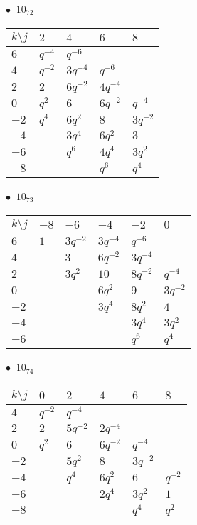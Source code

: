 %
\begin{minipage}{\linewidth}
$\bullet\ $ $10_{72}$ \vspace{0.5em} \\
\begin{tabular}{l|llll}
$k \setminus j$ & $2$ & $4$ & $6$ & $8$ \\
\hline
$6$ & $q^{-4}$ & $q^{-6}$ &  &  \\
$4$ & $q^{-2}$ & $3q^{-4}$ & $q^{-6}$ &  \\
$2$ & $2$ & $6q^{-2}$ & $4q^{-4}$ &  \\
$0$ & $q^{2}$ & $6$ & $6q^{-2}$ & $q^{-4}$ \\
$-2$ & $q^{4}$ & $6q^{2}$ & $8$ & $3q^{-2}$ \\
$-4$ &  & $3q^{4}$ & $6q^{2}$ & $3$ \\
$-6$ &  & $q^{6}$ & $4q^{4}$ & $3q^{2}$ \\
$-8$ &  &  & $q^{6}$ & $q^{4}$ \\
\end{tabular}
\vspace{2em}
\end{minipage}
%
\begin{minipage}{\linewidth}
$\bullet\ $ $10_{73}$ \vspace{0.5em} \\
\begin{tabular}{l|lllll}
$k \setminus j$ & $-8$ & $-6$ & $-4$ & $-2$ & $0$ \\
\hline
$6$ & $1$ & $3q^{-2}$ & $3q^{-4}$ & $q^{-6}$ &  \\
$4$ &  & $3$ & $6q^{-2}$ & $3q^{-4}$ &  \\
$2$ &  & $3q^{2}$ & $10$ & $8q^{-2}$ & $q^{-4}$ \\
$0$ &  &  & $6q^{2}$ & $9$ & $3q^{-2}$ \\
$-2$ &  &  & $3q^{4}$ & $8q^{2}$ & $4$ \\
$-4$ &  &  &  & $3q^{4}$ & $3q^{2}$ \\
$-6$ &  &  &  & $q^{6}$ & $q^{4}$ \\
\end{tabular}
\vspace{2em}
\end{minipage}
%
\begin{minipage}{\linewidth}
$\bullet\ $ $10_{74}$ \vspace{0.5em} \\
\begin{tabular}{l|lllll}
$k \setminus j$ & $0$ & $2$ & $4$ & $6$ & $8$ \\
\hline
$4$ & $q^{-2}$ & $q^{-4}$ &  &  &  \\
$2$ & $2$ & $5q^{-2}$ & $2q^{-4}$ &  &  \\
$0$ & $q^{2}$ & $6$ & $6q^{-2}$ & $q^{-4}$ &  \\
$-2$ &  & $5q^{2}$ & $8$ & $3q^{-2}$ &  \\
$-4$ &  & $q^{4}$ & $6q^{2}$ & $6$ & $q^{-2}$ \\
$-6$ &  &  & $2q^{4}$ & $3q^{2}$ & $1$ \\
$-8$ &  &  &  & $q^{4}$ & $q^{2}$ \\
\end{tabular}
\vspace{2em}
\end{minipage}
